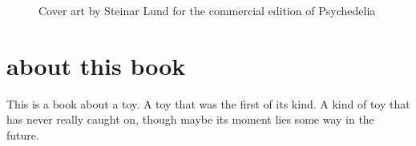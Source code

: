 \begin{figure}[H]
    \centering
    \begin{adjustbox}{width=12cm,center}
    \end{adjustbox}
\caption{Cover art by Steinar Lund for the commercial edition of Psychedelia}
\end{figure}
\clearpage
\chapter*{about this book} 
This is a book about a toy. A toy that was the first of its kind. A kind of toy that has never really caught on,
though maybe its moment lies some way in the future. 

